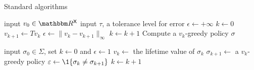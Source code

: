 \documentclass[dvipsnames]{beamer}
\begin{document}
\begin{frame}
    
    Standard algorithms

\end{frame}

\begin{frame}

    {\small 
        \begin{algorithm}[H]
        \DontPrintSemicolon
        \vspace{0.2em}
        input $v_0 \in \RR^\Xsf$ \;
        \vspace{0.2em}
        input $\tau$, a tolerance level for error \;
        \vspace{0.2em}
        $\epsilon \leftarrow +\infty$ \;
        \vspace{0.2em}
        $k \leftarrow 0$ \;
        \vspace{0.2em}
        \While{$\epsilon > \tau $}
        {
        \vspace{0.2em}
            $v_{k+1} \leftarrow Tv_k$ \;
            \vspace{0.2em}
            $\epsilon \leftarrow \| v_k - v_{k+1} \|_\infty$ \;
            \vspace{0.2em}
            $k \leftarrow k + 1$ \;
        \vspace{0.2em}
        }
        \vspace{0.2em}
        Compute a $v_k$-greedy policy $\sigma$ \;
        \vspace{0.2em}
        \Return{$\sigma$}
        \vspace{0.2em}
        \caption{VFI}
        \end{algorithm}
    }


\end{frame}



\begin{frame}
    

    \begin{algorithm}[H]
        \DontPrintSemicolon
        \vspace{0.5em}
        input $\sigma_0 \in \Sigma$, set $k \leftarrow 0$ and $\epsilon \leftarrow 1$ \;
        \vspace{0.5em}
        {
            $v_k \leftarrow $ the lifetime value of $\sigma_k$ \;
        \vspace{0.5em}
            $\sigma_{k+1} \leftarrow $ a $v_k$-greedy policy \;
        \vspace{0.5em}
            $\epsilon \leftarrow \1\{ \sigma_k \not= \sigma_{k+1} \}$ \;
        \vspace{0.5em}
            $k \leftarrow k + 1$ \;
        }
        \vspace{0.5em}
        \caption{HPI}
    \end{algorithm}

\end{frame}
\end{document}
